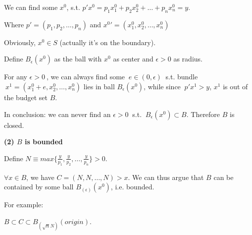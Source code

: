 \documentclass{article}
\begin{document}
\vspace{2mm}

We can find some $x^0$, s.t. $p'x^0 = p_1x^0_1 + p_2x^0_2 + \ldots + p_nx^0_n = y$.

Where $p' = (p_1, p_2, \ldots, p_n)$ and ${x^0}' = (x^0_1, x^0_2, \ldots, x^0_n)$

Obviously, $x^0 \in  S$ (actually it's on the boundary).

\medskip

Define $B_{\epsilon}(x^0)$ as the ball with $x^0$ as center and $\epsilon > 0$ as radius.

For any $\epsilon > 0 \ $, we can always find some $ \ e \in (0, \epsilon) \ $ s.t. bundle 
$\ x^1 = (x^0_1 + e, x^0_2, \ldots, x^0_n)$ lies in ball $B_{\epsilon}(x^0)$, while since $\ p'x^1 > y$, 
$x^1$ is out of the budget set $B$.

\medskip

In conclusion: we can never find an $\epsilon > 0 \ $ s.t. $\ B_{\epsilon}(x^0) \subset B$. Therefore
$B$ is closed.

\bigskip

\textbf{(2) $B$ is bounded}

Define $N \equiv max\{\frac{y}{p_1},\frac{y}{p_2},\ldots, \frac{y}{p_n}\} > 0$.

$\forall x \in B$, we have $C = (N,N, \ldots, N) > x$. We can thus argue that $B$
can be contained by some ball  $B_{(\epsilon)}(x^0)$, i.e. bounded.

\begin{mdframed}[backgroundcolor=blue!20,linecolor=white]
For example:

{\centering
{}
\label{fig:1_15_bounded}}

\vspace{2mm}

$B \subset C \subset B_{(\sqrt{n}N)}(origin)$.
\end{mdframed}

\end{document}
